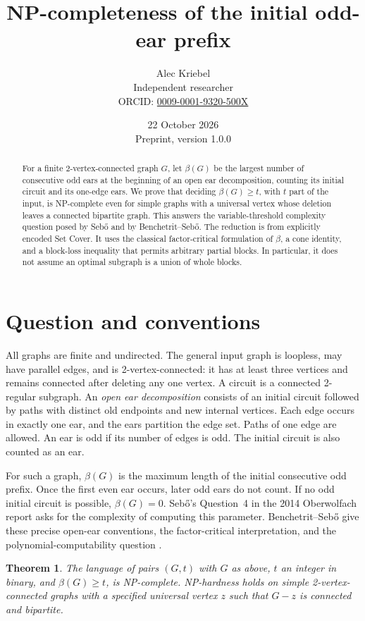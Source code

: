 \documentclass[11pt]{article}
\title{NP-completeness of the initial odd-ear prefix}
\author{Alec Kriebel\\
\small Independent researcher\\
\small ORCID: \href{https://orcid.org/0009-0001-9320-500X}{0009-0001-9320-500X}}
\date{22 October 2026\\\small Preprint, version 1.0.0}
\newtheorem{theorem}{Theorem}
\begin{document}
\maketitle
\begin{abstract}
For a finite 2-vertex-connected graph \(G\), let \(\beta(G)\) be the largest
number of consecutive odd ears at the beginning of an open ear decomposition,
counting its initial circuit and its one-edge ears. We prove that deciding
\(\beta(G)\ge t\), with \(t\) part of the input, is NP-complete even for simple
graphs with a universal vertex whose deletion leaves a connected bipartite
graph. This answers the variable-threshold complexity question posed by
Seb\H{o} and by Benchetrit--Seb\H{o}. The reduction is from explicitly encoded
Set Cover. It uses the classical factor-critical formulation of \(\beta\),
a cone identity, and a block-loss inequality that permits arbitrary partial
blocks. In particular, it does not assume an optimal subgraph is a union of
whole blocks.
\end{abstract}

\section{Question and conventions}
All graphs are finite and undirected. The general input graph is loopless,
may have parallel edges, and is 2-vertex-connected: it has at least three
vertices and remains connected after deleting any one vertex. A circuit is
a connected 2-regular subgraph. An \emph{open ear decomposition} consists of
an initial circuit followed by paths with distinct old endpoints and new
internal vertices. Each edge occurs in exactly one ear, and the ears
partition the edge set. Paths of one edge are allowed. An ear is odd if
its number of edges is odd. The initial circuit is also counted as an ear.

For such a graph, \(\beta(G)\) is the maximum length of the initial
consecutive odd prefix. Once the first even ear occurs, later odd ears do
not count. If no odd initial circuit is possible, \(\beta(G)=0\).
Seb\H{o}'s Question~4 in the 2014 Oberwolfach report
\cite[printed p.~2914]{Sebo} asks for the complexity of computing this
parameter. Benchetrit--Seb\H{o} give these precise open-ear conventions,
the factor-critical interpretation, and the polynomial-computability
question \cite[\S\S1.1,3.1, Question~3.3]{BS}.

\begin{theorem}\label{thm:main}
The language of pairs \((G,t)\) with \(G\) as above, \(t\) an integer in
binary, and \(\beta(G)\ge t\), is NP-complete. NP-hardness holds on simple
2-vertex-connected graphs with a specified universal vertex \(z\) such
that \(G-z\) is connected and bipartite.
\end{theorem}
\end{document}
